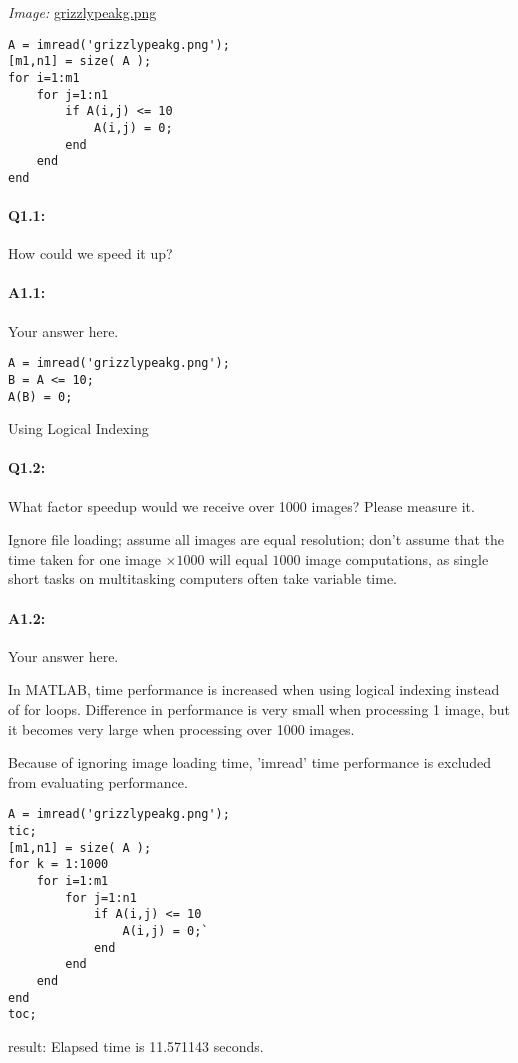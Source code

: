 \documentclass[11pt]{article}
\begin{document}
\emph{Image:} \href{grizzlypeakg.png}{grizzlypeakg.png}

\begin{lstlisting}[style=Matlab-editor]
A = imread('grizzlypeakg.png');
[m1,n1] = size( A );
for i=1:m1
    for j=1:n1
        if A(i,j) <= 10
            A(i,j) = 0;
        end
    end
end
\end{lstlisting}

\paragraph{Q1.1:} How could we speed it up?

\paragraph{A1.1:} Your answer here.

\begin{lstlisting}[style=Matlab-editor]
A = imread('grizzlypeakg.png');
B = A <= 10;
A(B) = 0;
\end{lstlisting}

Using Logical Indexing



\pagebreak
\paragraph{Q1.2:} What factor speedup would we receive over 1000 images? Please measure it.

Ignore file loading; assume all images are equal resolution; don't assume that the time taken for one image $\times1000$ will equal $1000$ image computations, as single short tasks on multitasking computers often take variable time.

\paragraph{A1.2:} Your answer here.

In MATLAB, time performance is increased when using logical indexing instead of for loops. Difference in performance is very small when processing 1 image, but it becomes very large when processing over 1000 images. 

Because of ignoring image loading time, 'imread' time performance is excluded from evaluating performance.
\begin{lstlisting}[style=Matlab-editor]
%using for loops
A = imread('grizzlypeakg.png');
tic;
[m1,n1] = size( A );
for k = 1:1000
    for i=1:m1
        for j=1:n1
            if A(i,j) <= 10
                A(i,j) = 0;`
            end
        end
    end
end
toc;
\end{lstlisting}
result: Elapsed time is 11.571143 seconds.
\end{document}
